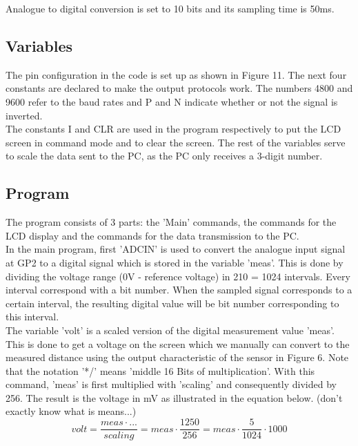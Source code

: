 \documentclass[12pt]{article}
\begin{document}
\noindent Analogue to digital conversion is set to 10 bits and its sampling time is 50ms. 

\subsection{Variables}

The pin configuration in the code is set up as shown in Figure 11. The next four constants are declared to make the output protocols work. The numbers 4800 and 9600 refer to the baud rates and P and N indicate whether or not the signal is inverted.\\

\noindent The constants I and CLR are used in the program respectively to put the LCD screen in command mode and to clear the screen. The rest of the variables serve to scale the data sent to the PC, as the PC only receives a 3-digit number.

\subsection{Program}


The program consists of 3 parts: the ’Main’ commands, the commands for the LCD display and the commands for the data transmission to the PC.\\

\noindent In the main program, first ’ADCIN’ is used to convert the analogue input signal at GP2 to a digital signal which is stored in the variable ’meas’. This is done by dividing the voltage range (0V - reference voltage) in 210 = 1024 intervals. Every interval correspond with a bit number. When the sampled signal corresponds to a certain interval, the resulting digital value will be bit number corresponding to this interval.\\

\noindent The variable ’volt’ is a scaled version of the digital measurement value ’meas’. This is done to get a voltage on the screen which we manually can convert to the measured distance using the output characteristic of the sensor in Figure 6. Note that the notation ’*/’ means ’middle 16 Bits of multiplication’. With this command, ’meas’ is first multiplied with ’scaling’ and consequently divided by 256. The result is the voltage in mV as illustrated in the equation below. (don't exactly know what is means...)\\

\begin{equation}
    volt = \dfrac{meas \cdot ... }{scaling} = meas\cdot \dfrac{1250}{256} = meas \cdot \dfrac{5}{1024} \cdot 1000
\end{equation}\\
\end{document}
